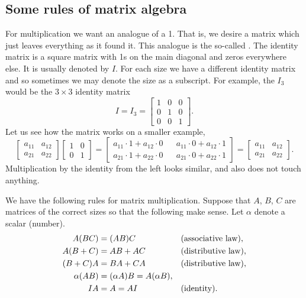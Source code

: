 \subsection{Some rules of matrix algebra}

For multiplication we want an analogue of a 1.  That is,
we desire a matrix which just leaves everything as it found it.
This analogue is the
so-called \emph{}.
The identity matrix is a square matrix with 1s on the
main diagonal and zeros everywhere else.  It is usually denoted by $I$.
For each size we have a different identity matrix and so sometimes we may denote
the size as a subscript.  For example, the $I_3$ would be the $3 \times 3$
identity matrix
\begin{equation*}
I = I_3 =
\begin{bmatrix}
1 & 0 & 0 \\
0 & 1 & 0 \\
0 & 0 & 1
\end{bmatrix} .
\end{equation*}
Let us see how the matrix works on a smaller example,
\begin{equation*}
\begin{bmatrix}
a_{11} & a_{12} \\
a_{21} & a_{22} 
\end{bmatrix}
\begin{bmatrix}
1 & 0 \\
0 & 1
\end{bmatrix} =
\begin{bmatrix}
a_{11} \cdot 1 + a_{12} \cdot 0
& &
a_{11} \cdot 0 + a_{12} \cdot 1
\\
a_{21} \cdot 1 + a_{22} \cdot 0
& &
a_{21} \cdot 0 + a_{22} \cdot 1
\end{bmatrix}
=
\begin{bmatrix}
a_{11} & a_{12} \\
a_{21} & a_{22} 
\end{bmatrix} .
\end{equation*}
Multiplication by the identity from the left looks similar, and also
does not touch anything.

\medskip

We have the following rules for matrix multiplication.  Suppose that
$A$, $B$, $C$ are matrices of the correct sizes so that the following
make sense.  Let $\alpha$ denote a scalar (number).
\begin{align*}
A(BC) & = (AB)C & & \text{(\myindex{associative law})} , \\
A(B+C) & = AB + AC & & \text{(\myindex{distributive law})} , \\
(B+C)A & = BA + CA & & \text{(distributive law)} , \\
\alpha(AB) & = (\alpha A)B = A(\alpha B) , & &  \\
IA & = A = AI & & \text{(identity)}.
\end{align*}

